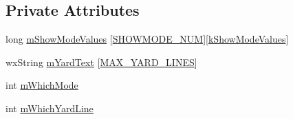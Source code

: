 \subsection*{Private Attributes}
\begin{DoxyCompactItemize}
\item 
long \hyperlink{a00141_a719647c3fd514a9221012f57e0a4462f}{m\-Show\-Mode\-Values} \mbox{[}\hyperlink{a00191_acf773163120190d181b9f53d1fa4bb9ca39ab6edfbd568a04aacfb5ae6a43cb12}{S\-H\-O\-W\-M\-O\-D\-E\-\_\-\-N\-U\-M}\mbox{]}\mbox{[}\hyperlink{a00191_a9f04f33b4133efadaca3371489a3e3e0}{k\-Show\-Mode\-Values}\mbox{]}
\item 
wx\-String \hyperlink{a00141_a6f32e0bc34daf76831f10a6074411c82}{m\-Yard\-Text} \mbox{[}\hyperlink{a00191_ad80cbf96e4b808112d8433ff73da45a8}{M\-A\-X\-\_\-\-Y\-A\-R\-D\-\_\-\-L\-I\-N\-E\-S}\mbox{]}
\item 
int \hyperlink{a00141_a8087962d62c3be79421a49d86c99bbec}{m\-Which\-Mode}
\item 
int \hyperlink{a00141_ab487eddeeb6cbb918b4e142aff3b8a42}{m\-Which\-Yard\-Line}
\end{DoxyCompactItemize}



